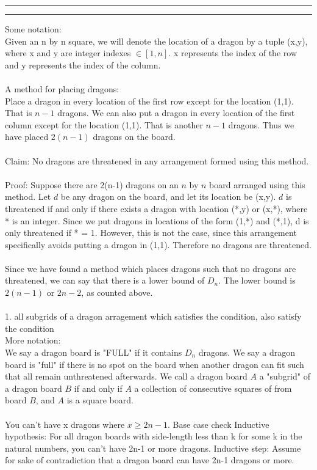 \documentclass[11pt]{article}
\newcounter{questionCounter}
\newcounter{partCounter}[questionCounter]
\newenvironment{question}[2][\arabic{questionCounter}]{%
    \setcounter{partCounter}{0}%
    \vspace{.25in} \hrule \vspace{0.5em}%
        \noindent{\bf #2}%
    \vspace{0.8em} \hrule \vspace{.10in}%
    \addtocounter{questionCounter}{1}%
}{}
\begin{document}
\begin{question}{Dragon Chess}
Some notation:\\
Given an n by n square, we will denote the location of a dragon by a tuple (x,y), where x and y are integer indexes $\in [1,n]$. x represents the index of the row and y represents the index of the column.\\
\\
A method for placing dragons:\\
Place a dragon in every location of the first row except for the location (1,1). That is $n-1$ dragons. We can also put a dragon in every location of the first column except for the location (1,1). That is another $n-1$ dragons. Thus we have placed $2(n-1)$ dragons on the board.\\
\\
Claim: No dragons are threatened in any arrangement formed using this method.\\
\\
Proof: Suppose there are 2(n-1) dragons on an $n$ by $n$ board arranged using this method. Let $d$ be any dragon on the board, and let its location be (x,y). $d$ is threatened if and only if there exists a dragon with location (*,y) or (x,*), where * is an integer. Since we put dragons in locations of the form (1,*) and (*,1), d is only threatened if * = 1. However, this is not the case, since this arrangement specifically avoids putting a dragon in (1,1). Therefore no dragons are threatened.\\
\\
Since we have found a method which places dragons such that no dragons are threatened, we can say that there is a lower bound of $D_n$. The lower bound is $2(n-1)$ or $2n-2$, as counted above.\\
\\
1. all subgrids of a dragon arragement which satisfies the condition, also satisfy the condition\\
More notation: \\
We say a dragon board is "FULL" if it contains $D_n$ dragons. We say a dragon board is "full" if there is no spot on the board when another dragon can fit such that all remain unthreatened afterwards. We call a dragon board $A$ a "subgrid" of a dragon board $B$ if and only if $A$ a collection of consecutive squares of from board $B$, and $A$ is a square board.\\
\\

You can't have x dragons where $x \geq 2n-1$.
Base case check
Inductive hypothesis:
For all dragon boards with side-length less than k for some k in the natural numbers, you can't have 2n-1 or more dragons.
Inductive step:
Assume for sake of contradiction that a dragon board can have 2n-1 dragons or more. 


\end{question}
\end{document}
